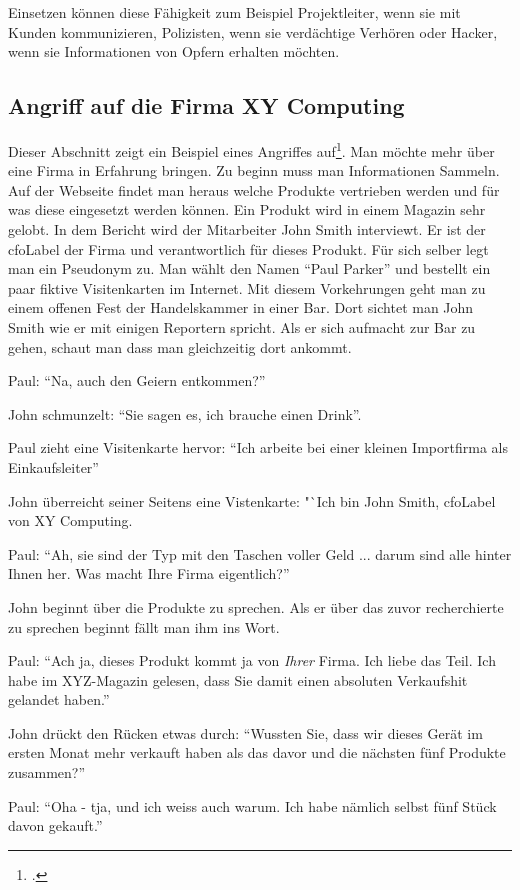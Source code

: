 Einsetzen können diese Fähigkeit zum Beispiel Projektleiter, wenn sie mit Kunden kommunizieren, Polizisten, wenn sie verdächtige Verhören oder Hacker, wenn sie Informationen von Opfern erhalten möchten.

\subsection{Angriff auf die Firma XY Computing}
Dieser Abschnitt zeigt ein Beispiel eines Angriffes auf\footcite{human_hacking}. Man möchte mehr über eine Firma in Erfahrung bringen. Zu beginn muss man Informationen Sammeln. Auf der Webseite findet man heraus welche Produkte vertrieben werden und für was diese eingesetzt werden können. Ein Produkt wird in einem Magazin sehr gelobt. In dem Bericht wird der Mitarbeiter John Smith interviewt. Er ist der \Gls{cfoLabel} der Firma und verantwortlich für dieses Produkt.
Für sich selber legt man ein Pseudonym zu. Man wählt den Namen "`Paul Parker"' und bestellt ein paar fiktive Visitenkarten im Internet. 
Mit diesem Vorkehrungen geht man zu einem offenen Fest der Handelskammer in einer Bar. Dort sichtet man John Smith wie er mit einigen Reportern spricht. Als er sich aufmacht zur Bar zu gehen, schaut man dass man gleichzeitig dort ankommt. 

Paul: "`Na, auch den Geiern entkommen?"'

John schmunzelt: "`Sie sagen es, ich brauche einen Drink"'.

Paul zieht eine Visitenkarte hervor: "`Ich arbeite bei einer kleinen Importfirma als Einkaufsleiter"'

John überreicht seiner Seitens eine Vistenkarte: "`Ich bin John Smith, \Gls{cfoLabel} von XY Computing.

Paul: "`Ah, sie sind der Typ mit den Taschen voller Geld ... darum sind alle hinter Ihnen her. Was macht Ihre Firma eigentlich?"'

John beginnt über die Produkte zu sprechen. Als er über das zuvor recherchierte zu sprechen beginnt fällt man ihm ins Wort.

Paul: "`Ach ja, dieses Produkt kommt ja von \textit{Ihrer} Firma. Ich liebe das Teil. Ich habe im XYZ-Magazin gelesen, dass Sie damit einen absoluten Verkaufshit gelandet haben."'

John drückt den Rücken etwas durch: "`Wussten Sie, dass wir dieses Gerät im ersten Monat mehr verkauft haben als das davor und die nächsten fünf Produkte zusammen?"'

Paul: "`Oha - tja, und ich weiss auch warum. Ich habe nämlich selbst fünf Stück davon gekauft."'

